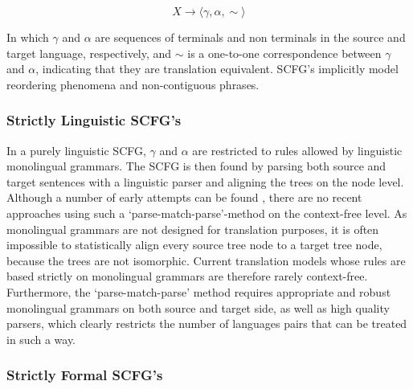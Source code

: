 \documentclass{report}
\theoremstyle{definition}
\theoremstyle{plain}
\begin{document}
\[
X \to \langle \gamma , \alpha , \sim \rangle
\]

In which $\gamma$ and $\alpha$ are sequences of terminals and non terminals in the source and target language, respectively, and $\sim$ is a one-to-one correspondence between $\gamma$ and $\alpha$, indicating that they are translation equivalent. SCFG's implicitly model reordering phenomena and non-contiguous phrases.

\subsubsection{Strictly Linguistic SCFG's}

In a purely linguistic SCFG, $\gamma$ and $\alpha$ are restricted to rules allowed by linguistic monolingual grammars. The SCFG is then found by parsing both source and target sentences with a linguistic parser and aligning the trees on the node level. Although a number of early attempts can be found \citep[see][p. 20]{wu1997stochastic}, there are no recent approaches using such a `parse-match-parse'-method on the context-free level. As monolingual grammars are not designed for translation purposes, it is often impossible to statistically align every source tree node to a target tree node, because the trees are not isomorphic. Current translation models whose rules are based strictly on monolingual grammars are therefore rarely context-free. Furthermore, the `parse-match-parse' method requires appropriate and robust monolingual grammars on both source and target side, as well as high quality parsers, which clearly restricts the number of languages pairs that can be treated in such a way.

\subsubsection{Strictly Formal SCFG's}
\end{document}
